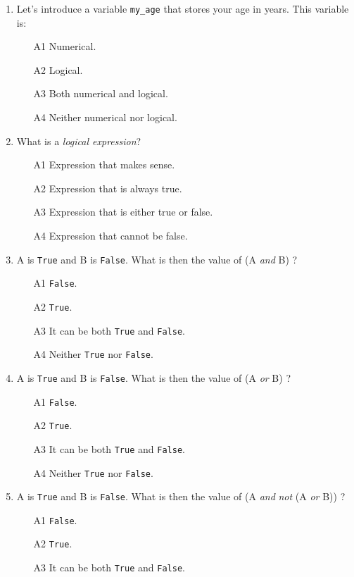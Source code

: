 \begin{enumerate}
\item Let's introduce a variable {\tt my\_age} that stores your age in years.
      This variable is:
\begin{enumerate}
\item[A1] Numerical.
\item[A2] Logical.
\item[A3] Both numerical and logical.
\item[A4] Neither numerical nor logical.
\end{enumerate}
\item What is a {\em logical expression}? 
\begin{enumerate}
\item[A1] Expression that makes sense.
\item[A2] Expression that is always true. 
\item[A3] Expression that is either true or false.
\item[A4] Expression that cannot be false.
\end{enumerate}
\item A is {\tt True} and B is {\tt False}. What is then the value of (A {\em and} B) ?
\begin{enumerate}
\item[A1] {\tt False}.
\item[A2] {\tt True}.
\item[A3] It can be both {\tt True} and {\tt False}.
\item[A4] Neither {\tt True} nor {\tt False}.
\end{enumerate}
\item A is {\tt True} and B is {\tt False}. What is then the value of (A {\em or} B) ?
\begin{enumerate}
\item[A1] {\tt False}.
\item[A2] {\tt True}.
\item[A3] It can be both {\tt True} and {\tt False}.
\item[A4] Neither {\tt True} nor {\tt False}.
\end{enumerate}
\item A is {\tt True} and B is {\tt False}. What is then the value of (A {\em and} {\em not} (A {\em or} B)) ?
\begin{enumerate}
\item[A1] {\tt False}.
\item[A2] {\tt True}.
\item[A3] It can be both {\tt True} and {\tt False}.

\end{enumerate}
\end{enumerate}
